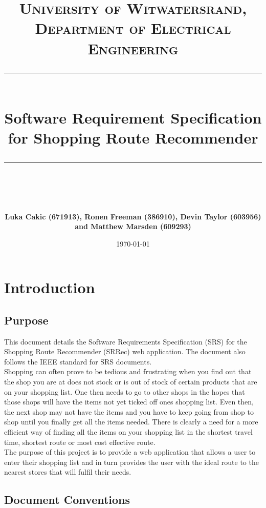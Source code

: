 \documentclass[10pt, a4paper, onecolumn]{scrartcl}
\newcommand{\horrule}[1]{\rule{\linewidth}{#1}}
\begin{document}
	
	\title{\normalfont \normalsize
		\textsc{University of Witwatersrand, Department of Electrical Engineering} \\ [10pt]
		\horrule{0.5pt} \\ [10pt]
		\huge Software Requirement Specification for Shopping Route Recommender \\
		\horrule{2pt} \\ [10pt]}
	\author{\textbf{\normalsize{Luka Cakic (671913), Ronen Freeman (386910), Devin Taylor (603956) and Matthew Marsden (609293)}} \\ [10pt]}
	\date {\normalsize \today}
	
	\maketitle
	
	
	\section{Introduction}
	
		\subsection{Purpose}
		
		This document details the Software Requirements Specification (SRS) for the Shopping Route Recommender (SRRec) web application. The document also follows the IEEE standard for SRS documents.\\
		
		Shopping can often prove to be tedious and frustrating when you find out that the shop you are at does not stock or is out of stock of certain products that are on your shopping list. One then needs to go to other shops in the hopes that those shops will have the items not yet ticked off ones shopping list. Even then, the next shop may not have the items and you have to keep going from shop to shop until you finally get all the items needed. There is clearly a need for a more efficient way of finding all the items on your shopping list in the shortest travel time, shortest route or most cost effective route.\\
		
		The purpose of this project is to provide a web application that allows a user to enter their shopping list and in turn provides the user with the ideal route to the nearest stores that will fulfil their needs.
		
		\subsection{Document Conventions}
		
\end{document}
